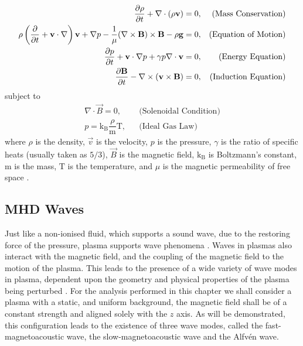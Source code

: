 \begin{align}                                                  
    \dfrac{\partial \rho }{\partial t} + \nabla \cdot (\rho \mathbf{v}) = 0,
    &&\text{(Mass Conservation)}\label{eq:imhd_mass}\\
    \rho  \left(\frac{\partial}{\partial t} + \mathbf{v}\cdot\nabla\right)\mathbf{v} + \nabla p - \dfrac{1}{\mu}(\nabla \times \mathbf{B}) \times \mathbf{B} - \rho \mathbf{g} = 0,
    &&\text{(Equation of Motion)}\label{eq:imhd_motion}\\
    \frac{\partial p}{\partial t} + \mathbf{v}\cdot\nabla p + \gamma p \nabla \cdot \mathbf{v}  = 0,
    &&\text{(Energy Equation)}\label{eq:imhd_equation}\\
    \dfrac{\partial \mathbf{B}}{\partial t} - \nabla \times (\mathbf{v} \times \mathbf{B}) = 0,
    &&\text{(Induction Equation)}\label{eq:imhd_induction}
\end{align}
subject to
\begin{align}
    \nabla \cdot \vec{B} = 0,
    &&\text{(Solenoidal Condition)}\\
    p = \mathrm{k_B} \dfrac{\rho}{\mathrm{m}} \mathrm{T},
    &&\text{(Ideal Gas Law)}                    
\end{align}
where $\rho$ is the density, $\vec{v}$ is the velocity, $p$ is the pressure, $\gamma$ is the ratio of specific heats (usually taken as $5/3$), $\vec{B}$ is the magnetic field, $\mathrm{k_B}$ is Boltzmann's constant, $\mathrm{m}$ is the mass, $\mathrm{T}$ is the temperature, and $\mu$ is the magnetic permeability of free space \citep{goedbloed2004}.


\subsection{MHD Waves}\label{sec:MHDwaves}
Just like a non-ionised fluid, which supports a sound wave, due to the restoring force of the pressure, plasma supports wave phenomena \citep{alfven1942}.
Waves in plasmas also interact with the magnetic field, and the coupling of the magnetic field to the motion of the plasma.
This leads to the presence of a wide variety of wave modes in plasma, dependent upon the geometry and physical properties of the plasma being perturbed \citep{jess2015}.
For the analysis performed in this chapter we shall consider a plasma with a static, and uniform background, the magnetic field shall be of a constant strength and aligned solely with the $z$ axis.
As will be demonstrated, this configuration leads to the existence of three wave modes, called the fast-magnetoacoustic wave, the slow-magnetoacoustic wave and the Alfv\'en wave.

